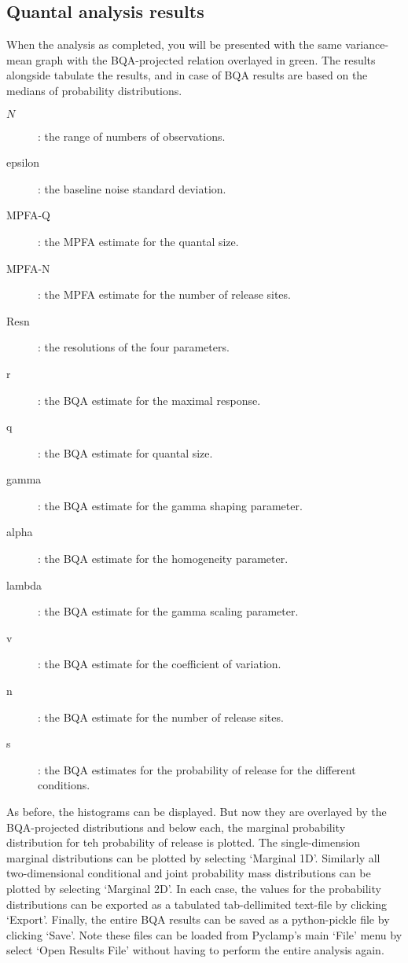 \documentclass{article}
\begin{document}
\subsection{Quantal analysis results}

When the analysis as completed, you will be presented with the same variance-mean graph with the BQA-projected relation
overlayed in green. The results alongside tabulate the results, and in case of BQA results are based on the medians of
probability distributions.

\begin{description}
	\item[$N$]: the range of numbers of observations.
	\item[epsilon]: the baseline noise standard deviation.
	\item[MPFA-Q]: the MPFA estimate for the quantal size.
	\item[MPFA-N]: the MPFA estimate for the number of release sites.
	\item[Resn]: the resolutions of the four parameters.
	\item[r]: the BQA estimate for the maximal response.
	\item[q]: the BQA estimate for quantal size.
	\item[gamma]: the BQA estimate for the gamma shaping parameter.
	\item[alpha]: the BQA estimate for the homogeneity parameter.
	\item[lambda]: the BQA estimate for the gamma scaling parameter.
	\item[v]: the BQA estimate for the coefficient of variation.
	\item[n]: the BQA estimate for the number of release sites.
	\item[s]: the BQA estimates for the probability of release for the different conditions.
\end{description}

As before, the histograms can be displayed. But now they are overlayed by the BQA-projected distributions and below
each, the marginal probability distribution for teh probability of release is plotted. The single-dimension marginal
distributions can be plotted by selecting `Marginal 1D'. Similarly all two-dimensional conditional and joint probability
mass distributions can be plotted by selecting `Marginal 2D'. In each case, the values for the probability distributions
can be exported as a tabulated tab-dellimited text-file by clicking `Export'. Finally, the entire BQA results can be
saved as a python-pickle file by clicking `Save'. Note these files can be loaded from Pyclamp's main `File' menu by
select `Open Results File' without having to perform the entire analysis again.
\end{document}

